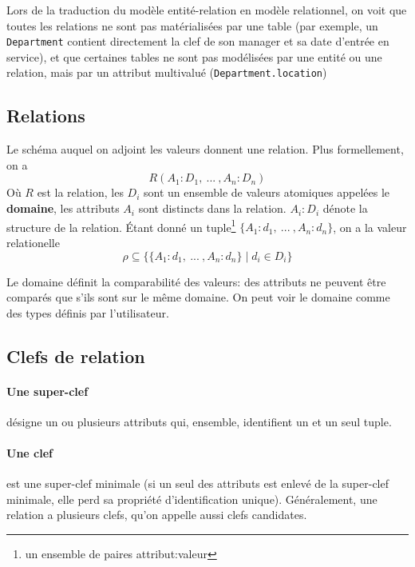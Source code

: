 \documentclass[a4paper]{article}
\begin{document}
Lors de la traduction du modèle entité-relation en modèle relationnel, on voit
que toutes les relations ne sont pas matérialisées par une table (par exemple,
un \texttt{Department} contient directement la clef de son manager et sa date d'entrée en service),
et que certaines tables ne sont pas modélisées par une entité ou une relation, mais
par un attribut multivalué (\texttt{Department.location})

\subsection{Relations}
Le schéma auquel on adjoint les valeurs donnent une relation. Plus formellement, on a
\begin{equation}
  R(A_1:D_1, ~ ... ~ , A_n:D_n)
\end{equation}
Où $R$ est la relation, les $D_i$ sont un ensemble de valeurs atomiques appelées le \textbf{domaine},
les attributs $A_i$ sont distincts dans la relation. $A_i : D_i$ dénote la structure de la relation.
\'Etant donné un tuple\footnote{un ensemble de paires attribut:valeur} $\{A_1: d_1, ~...~, A_n: d_n\}$, on a la valeur relationelle
\begin{equation}
  \rho \subseteq \{\{A_1:d_1, ~...~, A_n:d_n\} \mid d_i \in D_i\}
\end{equation}

Le domaine définit la comparabilité des valeurs: des attributs ne peuvent être comparés
que s'ils sont sur le même domaine. On peut voir le domaine comme des types définis par
l'utilisateur.

\subsection{Clefs de relation}

\paragraph{Une super-clef} désigne un ou plusieurs attributs qui, ensemble, identifient
un et un seul tuple.

\paragraph{Une clef} est une super-clef minimale (si un seul des attributs est
enlevé de la super-clef minimale, elle perd sa propriété d'identification unique).
Généralement, une relation a plusieurs clefs, qu'on appelle aussi clefs candidates.
\end{document}
